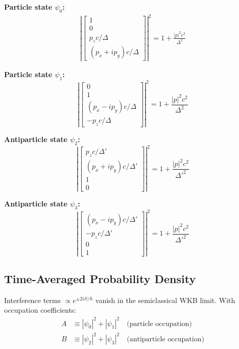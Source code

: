 \documentclass[11pt,a4paper]{article}
\theoremstyle{definition}
\theoremstyle{remark}
\begin{document}
	\textbf{Particle state $\psi_0$:}
	\begin{align}
		\left|\begin{bmatrix}1\\0\\ p_zc/\Delta\\ (p_x+ip_y)c/\Delta\end{bmatrix}\right|^2
		= 1 + \frac{|p|^2 c^2}{\Delta^2}
		\label{eq:norm_psi0}
	\end{align}
	
	\textbf{Particle state $\psi_1$:}
	\begin{equation}
		\left|\begin{bmatrix}0\\1\\ (p_x-ip_y)c/\Delta\\ -p_zc/\Delta\end{bmatrix}\right|^2 = 1 + \frac{|p|^2 c^2}{\Delta^2}
		\label{eq:norm_psi1}
	\end{equation}
	
	\textbf{Antiparticle state $\psi_2$:}
	\begin{equation}
		\left|\begin{bmatrix}p_zc/\Delta'\\ (p_x+ip_y)c/\Delta'\\1\\0\end{bmatrix}\right|^2 = 1 + \frac{|p|^2 c^2}{\Delta'^2}
		\label{eq:norm_psi2}
	\end{equation}
	
	\textbf{Antiparticle state $\psi_3$:}
	\begin{equation}
		\left|\begin{bmatrix}(p_x-ip_y)c/\Delta'\\ -p_zc/\Delta'\\0\\1\end{bmatrix}\right|^2 = 1 + \frac{|p|^2 c^2}{\Delta'^2}
		\label{eq:norm_psi3}
	\end{equation}
	
	\subsection{Time-Averaged Probability Density}
	
	Interference terms $\propto e^{\pm 2iS/\hbar}$ vanish in the semiclassical WKB limit.  With occupation coefficients:
	\begin{align}
		A &\equiv |\psi_0|^2+|\psi_1|^2 \quad\text{(particle occupation)} \\
		B &\equiv |\psi_2|^2+|\psi_3|^2 \quad\text{(antiparticle occupation)}
	\end{align}
	
\end{document}
